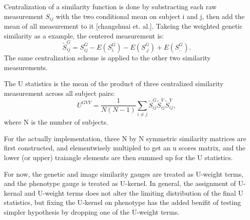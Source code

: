 \documentclass[twocolumn]{article}
\begin{document}
Centralization of a similarity function is done by substracting each raw measurement $S_{ij}$ with the two conditional mean on subject i and j, then add the mean of all measurement to it [changshuai et. al.]. Takeing the weighted genetic similarity as a example, the centered measurement is:
\begin{displaymath}
  \tilde{S}_{ij}^{G}=S_{ij}^{G}-E(S_{i.}^{G})-E(S_{.j}^{G})+E(S_{..}^{G}).
\end{displaymath}
The same centralization scheme is applied to the other two similarity measurements.

The U statistics is the mean of the product of three centralized similarity measurement across all subject pairs:
\begin{displaymath}
  U^{GVY}=\frac{1}{N(N-1)}\sum_{i \neq j} \tilde{S}_{ij}^{G} \tilde{S}_{ij}^{V} \tilde{S}_{ij}^{Y},
\end{displaymath}
where N is the number of subjects.



For the actually implementation, three N by N symmetric similarity matrices are first constructed, and elementwisely multipled to get an u scores matrix, and the lower (or upper) traiangle elements are then summed up for the U statistics.

For now, the genetic and image similarity gauges are treated as U-weight terms, and the phenotype gauge is treated as U-kernel. In general, the assignment of U-kernal and U-weight terms does not alter the limiting distribution of the final U statistics, but fixing the U-kernel on phenotype has the added benifit of testing simpler hypothesis by dropping one of the U-weight terms.

\end{document}
